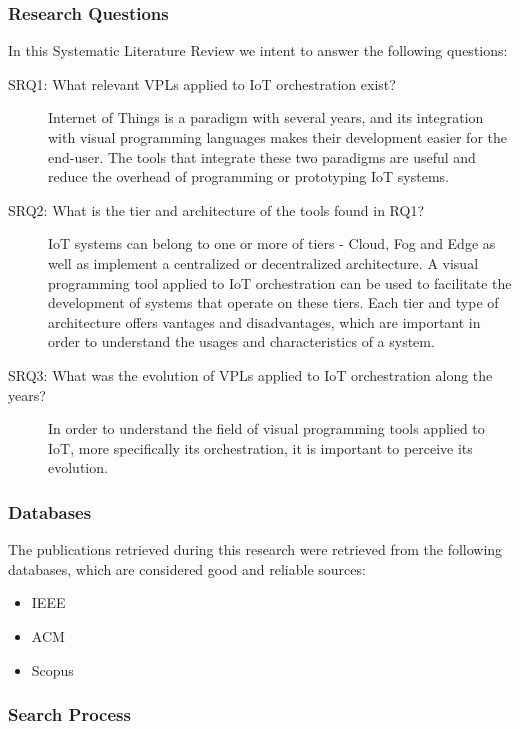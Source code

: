 \subsubsection{Research Questions}\label{sec:slr_research_questions}

In this Systematic Literature Review we intent to answer the following questions:

\begin{description}
    \item [SRQ1: What relevant VPLs applied to IoT orchestration exist?] Internet of Things is a paradigm with several years, and its integration with visual programming languages makes their development easier for the end-user. The tools that integrate these two paradigms are useful and reduce the overhead of programming or prototyping IoT systems.
    \item [SRQ2: What is the tier and architecture of the tools found in RQ1?] IoT systems can belong to one or more of tiers - Cloud, Fog and Edge as well as implement a centralized or decentralized architecture. A visual programming tool applied to IoT orchestration can be used to facilitate the development of systems that operate on these tiers. Each tier and type of architecture offers vantages and disadvantages, which are important in order to understand the usages and characteristics of a system.
    \item [SRQ3: What was the evolution of VPLs applied to IoT orchestration along the years?] In order to understand the field of visual programming tools applied to IoT, more specifically its orchestration, it is important to perceive its evolution.
\end{description}

\subsubsection{Databases}\label{sec:databases}

The publications retrieved during this research were retrieved from the following databases, which are considered good and reliable sources:

\begin{itemize}
    \item IEEE
    \item ACM
    \item Scopus
\end{itemize}{}

\subsubsection{Search Process}\label{sec:process}

